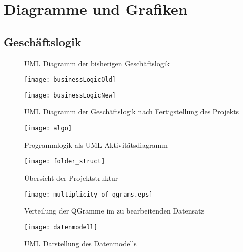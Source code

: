 \appendix
\label{section:anhang}
\section{Diagramme und Grafiken}

\begin{landscape}
\subsection{Geschäftslogik}
    \begin{figure}[!htp]
       \centering
       \begin{minipage}{0.45\textwidth}
         \centering
         \caption{UML Diagramm der bisherigen Geschäftslogik}%
         \label{fig:businessLogicAlt}%
         \texttt{[image: businessLogicOld]}%
       \end{minipage}\hspace*{4ex}%
       \begin{minipage}{0.57\textwidth}
         \centering
         \caption{UML Diagramm der Geschäftslogik nach Fertigstellung des Projekts}%
         \label{fig:businessLogicAlt}%
         \texttt{[image: businessLogicNew]}%
       \end{minipage}
    \end{figure}

\end{landscape}


\begin{figure}[!htp]
	\caption{Programmlogik als UML Aktivitätsdiagramm}
	\label{fig:programmlogik}
	\texttt{[image: algo]}
	\centering
\end{figure}

\clearpage
\begin{figure}[!htp]
	\caption{Übersicht der Projektstruktur}
	\label{fig:folderstruct}
	\texttt{[image: folder\_struct]}
\end{figure}

\begin{figure}[!htp]
    \caption{Verteilung der QGramme im zu bearbeitenden Datensatz}
    \label{fig:qgram_verteilung}
    \texttt{[image: multiplicity\_of\_qgrams.eps]}
    \centering
\end{figure}

\begin{figure}[!htp]
    \caption{UML Darstellung des Datenmodells}
    \label{fig:datenmodell}
    \texttt{[image: datenmodell]}
    \centering
\end{figure}


